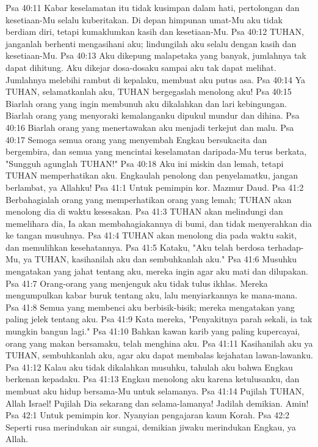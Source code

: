 Psa 40:11  Kabar keselamatan itu tidak kusimpan dalam hati, pertolongan dan kesetiaan-Mu selalu kuberitakan. Di depan himpunan umat-Mu aku tidak berdiam diri, tetapi kumaklumkan kasih dan kesetiaan-Mu.
Psa 40:12  TUHAN, janganlah berhenti mengasihani aku; lindungilah aku selalu dengan kasih dan kesetiaan-Mu.
Psa 40:13  Aku dikepung malapetaka yang banyak, jumlahnya tak dapat dihitung. Aku dikejar dosa-dosaku sampai aku tak dapat melihat. Jumlahnya melebihi rambut di kepalaku, membuat aku putus asa.
Psa 40:14  Ya TUHAN, selamatkanlah aku, TUHAN bergegaslah menolong aku!
Psa 40:15  Biarlah orang yang ingin membunuh aku dikalahkan dan lari kebingungan. Biarlah orang yang menyoraki kemalanganku dipukul mundur dan dihina.
Psa 40:16  Biarlah orang yang menertawakan aku menjadi terkejut dan malu.
Psa 40:17  Semoga semua orang yang menyembah Engkau bersukacita dan bergembira, dan semua yang mencintai keselamatan daripada-Mu terus berkata, "Sungguh agunglah TUHAN!"
Psa 40:18  Aku ini miskin dan lemah, tetapi TUHAN memperhatikan aku. Engkaulah penolong dan penyelamatku, jangan berlambat, ya Allahku!
Psa 41:1  Untuk pemimpin kor. Mazmur Daud.
Psa 41:2  Berbahagialah orang yang memperhatikan orang yang lemah; TUHAN akan menolong dia di waktu kesesakan.
Psa 41:3  TUHAN akan melindungi dan memelihara dia, Ia akan membahagiakannya di bumi, dan tidak menyerahkan dia ke tangan musuhnya.
Psa 41:4  TUHAN akan menolong dia pada waktu sakit, dan memulihkan kesehatannya.
Psa 41:5  Kataku, "Aku telah berdosa terhadap-Mu, ya TUHAN, kasihanilah aku dan sembuhkanlah aku."
Psa 41:6  Musuhku mengatakan yang jahat tentang aku, mereka ingin agar aku mati dan dilupakan.
Psa 41:7  Orang-orang yang menjenguk aku tidak tulus ikhlas. Mereka mengumpulkan kabar buruk tentang aku, lalu menyiarkannya ke mana-mana.
Psa 41:8  Semua yang membenci aku berbisik-bisik; mereka mengatakan yang paling jelek tentang aku.
Psa 41:9  Kata mereka, "Penyakitnya parah sekali, ia tak mungkin bangun lagi."
Psa 41:10  Bahkan kawan karib yang paling kupercayai, orang yang makan bersamaku, telah menghina aku.
Psa 41:11  Kasihanilah aku ya TUHAN, sembuhkanlah aku, agar aku dapat membalas kejahatan lawan-lawanku.
Psa 41:12  Kalau aku tidak dikalahkan musuhku, tahulah aku bahwa Engkau berkenan kepadaku.
Psa 41:13  Engkau menolong aku karena ketulusanku, dan membuat aku hidup bersama-Mu untuk selamanya.
Psa 41:14  Pujilah TUHAN, Allah Israel! Pujilah Dia sekarang dan selama-lamanya! Jadilah demikian. Amin!
Psa 42:1  Untuk pemimpin kor. Nyanyian pengajaran kaum Korah.
Psa 42:2  Seperti rusa merindukan air sungai, demikian jiwaku merindukan Engkau, ya Allah.
